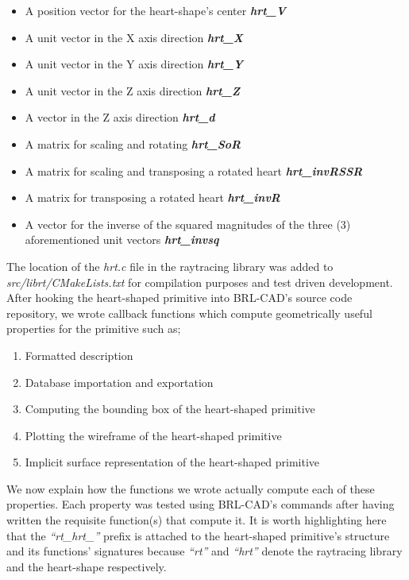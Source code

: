 \begin{itemize}
\item A position vector for the heart-shape's center \textbf{\textit{hrt\_V}}  
\item A unit vector in the X ­axis direction \textbf{\textit{hrt\_X}}  
\item A unit vector in the Y axis direction \textbf{\textit{hrt\_Y}}  
\item A unit vector in the Z axis direction \textbf{\textit{hrt\_Z}}  
\item A vector in the Z ­axis direction \textit{\textbf{hrt\_d}}  
\item A matrix for scaling and rotating \textit{\textbf{hrt\_SoR}}  
\item A matrix for scaling and transposing a rotated heart \textbf{\textit{hrt\_invRSSR}}  
\item A matrix for transposing a rotated heart \textit{\textbf{hrt\_invR}}  
\item A vector for the inverse of the squared magnitudes of the three (3) aforementioned unit vectors \textit{\textbf{hrt\_invsq}}  
\end{itemize}

The   location   of   the   \textit{hrt.c}   file   in   the   raytracing   library   was   added   to  
\textit{src/librt/CMakeLists.txt} for compilation purposes  and test ­driven development.\\
   
\hspace{30} After   hooking   the   heart-­shaped   primitive   into   BRL-­CAD's   source   code  
repository,   we   wrote   callback   functions   which   compute   geometrically   useful  
properties for the primitive such as;  
 
\begin{enumerate}
\item Formatted description  
\item Database importation and exportation  
\item Computing the bounding box of the heart­-shaped primitive  
\item Plotting the wireframe of the heart­-shaped primitive  
\item Implicit surface representation of the heart-­shaped primitive  
\end{enumerate}

\hspace{30} We   now   explain   how   the   functions   we   wrote   actually   compute   each
of   these properties.   Each   property   was   tested   using   BRL-­CAD's   commands \cite{36}   after  having   
written   the   requisite   function(s)   that   compute   it.   It   is   worth   highlighting  
here   that   the   \textit{“rt\_hrt\_”}   prefix   is   attached   to   the   heart­-shaped   primitive's   structure  
and   its   functions'   signatures   because   \textit{“rt”}   and   \textit{“hrt”}   denote   the   raytracing   library  
and the heart-shape respectively.  

